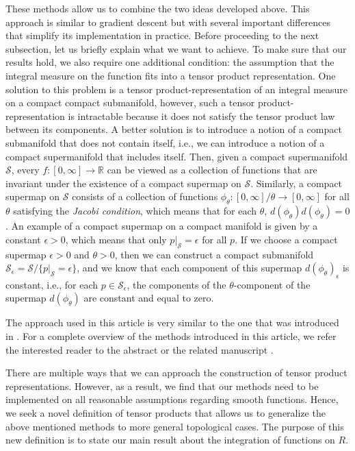 \documentclass[a4paper,reqno,oneside]{article}
\begin{document}
These methods allow us to combine the two ideas developed above. This approach is similar to gradient descent but with several important differences that simplify its implementation in practice. Before proceeding to the next subsection, let us briefly explain what we want to achieve. To make sure that our results hold, we also require one additional condition: the assumption that the integral measure on the function fits into a tensor product representation. One solution to this problem is a tensor product-representation of an integral measure on a compact compact submanifold, however, such a tensor product-representation is intractable because it does not satisfy the tensor product law between its components. A better solution is to introduce a notion of a compact submanifold that does not contain itself, i.e., we can introduce a notion of a compact supermanifold that includes itself. Then, given a compact supermanifold $\mathcal{S}$, every $f: [0,\infty] \to \mathbb{R}$ can be viewed as a collection of functions that are invariant under the existence of a compact supermap on $\mathcal{S}$. Similarly, a compact supermap on $\mathcal{S}$ consists of a collection of functions $\phi_\theta : [0,\infty]/\theta \to [0,\infty]$ for all $\theta$ satisfying the \textit{Jacobi condition}, which means that for each $\theta$, $d(\phi_\theta) d(\phi_\theta) = 0$. An example of a compact supermap on a compact manifold is given by a constant $\epsilon>0$, which means that only $p|_{\mathcal{S}}=\epsilon$ for all $p$. If we choose a compact supermap $\epsilon>0$ and $\theta>0$, then we can construct a compact submanifold $\mathcal{S}_{\epsilon}=\mathcal{S}/\{p|_{\mathcal{S}}=\epsilon\}$, and we know that each component of this supermap $d(\phi_\theta)_{\epsilon}$ is constant, i.e., for each $p\in \mathcal{S}_{\epsilon}$, the components of the $\theta$-component of the supermap $d(\phi_\theta)$ are constant and equal to zero. 

The approach used in this article is very similar to the one that was introduced in \cite{MR2958726}. For a complete overview of the methods introduced in this article, we refer the interested reader to the abstract or the related manuscript \cite{Gabriel2023}.

There are multiple ways that we can approach the construction of tensor product representations. However, as a result, we find that our methods need to be implemented on all reasonable assumptions regarding smooth functions. Hence, we seek a novel definition of tensor products that allows us to generalize the above mentioned methods to more general topological cases. The purpose of this new definition is to state our main result about the integration of functions on $R$. 
\end{document}
